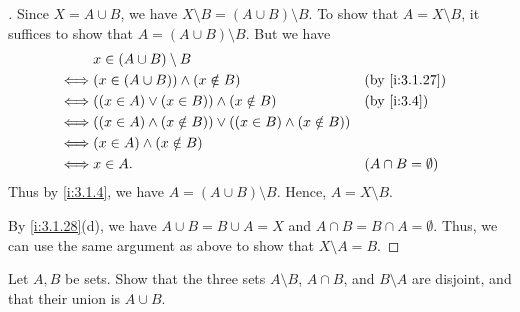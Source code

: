 \begin{proof}[]
  Since \(X = A \cup B\), we have \(X \setminus B = (A \cup B) \setminus B\).
  To show that \(A = X \setminus B\), it suffices to show that \(A = (A \cup B) \setminus B\).
  But we have
  \begin{align*}
         & x \in (A \cup B) \setminus B                                                                   \\
    \iff & (x \in (A \cup B)) \land (x \notin B)                              &  & \by{i:3.1.27}          \\
    \iff & ((x \in A) \lor (x \in B)) \land (x \notin B)                      &  & \by{i:3.4}             \\
    \iff & ((x \in A) \land (x \notin B)) \lor ((x \in B) \land (x \notin B))                             \\
    \iff & (x \in A) \land (x \notin B)                                                                   \\
    \iff & x \in A.                                                           &  & (A \cap B = \emptyset)
  \end{align*}
  Thus by \cref{i:3.1.4}, we have \(A = (A \cup B) \setminus B\).
  Hence, \(A = X \setminus B\).

  By \cref{i:3.1.28}(d), we have \(A \cup B = B \cup A = X\) and \(A \cap B = B \cap A = \emptyset\).
  Thus, we can use the same argument as above to show that \(X \setminus A = B\).
\end{proof}

\begin{ex}\label{i:ex:3.1.10}
  Let \(A, B\) be sets.
  Show that the three sets \(A \setminus B\), \(A \cap B\), and \(B \setminus A\) are disjoint, and that their union is \(A \cup B\).
\end{ex}

